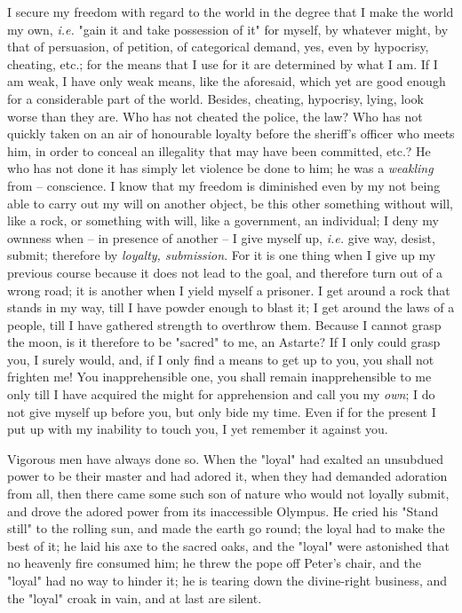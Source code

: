\documentclass[a4paper]{book}
\begin{document}
I secure my freedom with regard to the world in the degree that I make the 
world my own, \textit{i.e.} "{}gain it and take possession of it"{} for 
myself, by whatever might, by that of persuasion, of petition, of categorical 
demand, yes, even by hypocrisy, cheating, etc.; for the means that I use for 
it are determined by what I am. If I am weak, I have only weak means, like the 
aforesaid, which yet are good enough for a considerable part of the world. 
Besides, cheating, hypocrisy, lying, look worse than they are. Who has not 
cheated the police, the law? Who has not quickly taken on an air of honourable 
loyalty before the sheriff's officer who meets him, in order to conceal an 
illegality that may have been committed, etc.? He who has not done it has 
simply let violence be done to him; he was a \textit{weakling} from -- 
conscience. I know that my freedom is diminished even by my not being able to 
carry out my will on another object, be this other something without will, 
like a rock, or something with will, like a government, an individual; I deny 
my ownness when -- in presence of another -- I give myself up, \textit{i.e.} 
give way, desist, submit; therefore by \textit{loyalty, submission}. For it is 
one thing when I give up my previous course because it does not lead to the 
goal, and therefore turn out of a wrong road; it is another when I yield 
myself a prisoner. I get around a rock that stands in my way, till I have 
powder enough to blast it; I get around the laws of a people, till I have 
gathered strength to overthrow them. Because I cannot grasp the moon, is it 
therefore to be "{}sacred"{} to me, an Astarte? If I only could grasp you, I 
surely would, and, if I only find a means to get up to you, you shall not 
frighten me! You inapprehensible one, you shall remain inapprehensible to me 
only till I have acquired the might for apprehension and call you my 
\textit{own}; I do not give myself up before you, but only bide my time. Even 
if for the present I put up with my inability to touch you, I yet remember it 
against you.

Vigorous men have always done so. When the "{}loyal"{} had exalted an 
unsubdued power to be their master and had adored it, when they had demanded 
adoration from all, then there came some such son of nature who would not 
loyally submit, and drove the adored power from its inaccessible Olympus. He 
cried his "{}Stand still"{} to the rolling sun, and made the earth go round; 
the loyal had to make the best of it; he laid his axe to the sacred oaks, and 
the "{}loyal"{} were astonished that no heavenly fire consumed him; he threw 
the pope off Peter's chair, and the "{}loyal"{} had no way to hinder it; he is 
tearing down the divine-right business, and the "{}loyal"{} croak in vain, and 
at last are silent.
\end{document}
